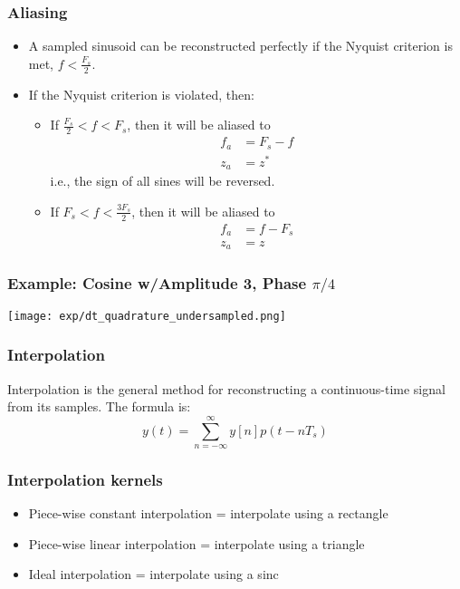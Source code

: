 \documentclass{beamer}
\begin{document}
\begin{frame}
  \frametitle{Aliasing}

  \begin{itemize}
  \item A sampled sinusoid can be reconstructed perfectly if the
    Nyquist criterion is met, $f < \frac{F_s}{2}$.
  \item If the Nyquist criterion is violated, then:
    \begin{itemize}
    \item If $\frac{F_s}{2}<f<F_s$, then it will be aliased to
      \begin{align*}
        f_a &= F_s-f\\
        z_a &= z^*
      \end{align*}
      i.e., the sign of all sines will be reversed.
    \item If $F_s < f < \frac{3F_s}{2}$, then it will be aliased to
      \begin{align*}
        f_a &= f-F_s\\
        z_a &= z
      \end{align*}
    \end{itemize}
  \end{itemize}
\end{frame}


\begin{frame}
  \frametitle{Example: Cosine w/Amplitude 3, Phase $\pi/4$}

  \centerline{\texttt{[image: exp/dt\_quadrature\_undersampled.png]}}
\end{frame}

\begin{frame}
  \frametitle{Interpolation}

  Interpolation is the general method for reconstructing a
  continuous-time signal from its samples.  The formula is:
  \begin{displaymath}
    y(t) = \sum_{n=-\infty}^\infty y[n]p(t-nT_s)
  \end{displaymath}
\end{frame}

\begin{frame}
  \frametitle{Interpolation kernels}
  \begin{itemize}
  \item Piece-wise constant interpolation = interpolate using a rectangle
  \item Piece-wise linear interpolation = interpolate using a triangle
  \item Ideal interpolation = interpolate using a sinc
  \end{itemize}
\end{frame}
\end{document}
